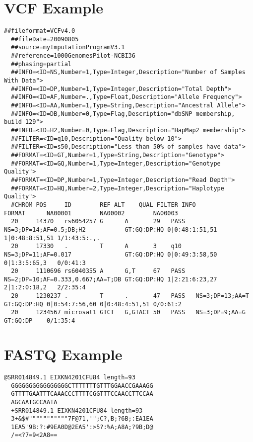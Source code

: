 \section{VCF Example}\label{annex:vcf}
\begin{lstlisting}[numbers=none, breaklines=true]
  ##fileformat=VCFv4.0
  ##fileDate=20090805
  ##source=myImputationProgramV3.1
  ##reference=1000GenomesPilot-NCBI36
  ##phasing=partial
  ##INFO=<ID=NS,Number=1,Type=Integer,Description="Number of Samples With Data">
  ##INFO=<ID=DP,Number=1,Type=Integer,Description="Total Depth">
  ##INFO=<ID=AF,Number=.,Type=Float,Description="Allele Frequency">
  ##INFO=<ID=AA,Number=1,Type=String,Description="Ancestral Allele">
  ##INFO=<ID=DB,Number=0,Type=Flag,Description="dbSNP membership, build 129">
  ##INFO=<ID=H2,Number=0,Type=Flag,Description="HapMap2 membership">
  ##FILTER=<ID=q10,Description="Quality below 10">
  ##FILTER=<ID=s50,Description="Less than 50% of samples have data">
  ##FORMAT=<ID=GT,Number=1,Type=String,Description="Genotype">
  ##FORMAT=<ID=GQ,Number=1,Type=Integer,Description="Genotype Quality">
  ##FORMAT=<ID=DP,Number=1,Type=Integer,Description="Read Depth">
  ##FORMAT=<ID=HQ,Number=2,Type=Integer,Description="Haplotype Quality">
  #CHROM POS     ID        REF ALT    QUAL FILTER INFO                              FORMAT      NA00001        NA00002        NA00003
  20     14370   rs6054257 G      A       29   PASS   NS=3;DP=14;AF=0.5;DB;H2           GT:GQ:DP:HQ 0|0:48:1:51,51 1|0:48:8:51,51 1/1:43:5:.,.
  20     17330   .         T      A       3    q10    NS=3;DP=11;AF=0.017               GT:GQ:DP:HQ 0|0:49:3:58,50 0|1:3:5:65,3   0/0:41:3
  20     1110696 rs6040355 A      G,T     67   PASS   NS=2;DP=10;AF=0.333,0.667;AA=T;DB GT:GQ:DP:HQ 1|2:21:6:23,27 2|1:2:0:18,2   2/2:35:4
  20     1230237 .         T      .       47   PASS   NS=3;DP=13;AA=T                   GT:GQ:DP:HQ 0|0:54:7:56,60 0|0:48:4:51,51 0/0:61:2
  20     1234567 microsat1 GTCT   G,GTACT 50   PASS   NS=3;DP=9;AA=G                    GT:GQ:DP    0/1:35:4 
\end{lstlisting}

\section{FASTQ Example}\label{annex:fastq}
\begin{lstlisting}[numbers=none, breaklines=true]
  @SRR014849.1 EIXKN4201CFU84 length=93
  GGGGGGGGGGGGGGGGCTTTTTTTGTTTGGAACCGAAAGG
  GTTTTGAATTTCAAACCCTTTTCGGTTTCCAACCTTCCAA
  AGCAATGCCAATA
  +SRR014849.1 EIXKN4201CFU84 length=93
  3+&$#"""""""""""7F@71,'";C?,B;?6B;:EA1EA
  1EA5'9B:?:#9EA0D@2EA5':>5?:%A;A8A;?9B;D@
  /=<?7=9<2A8==
\end{lstlisting}

